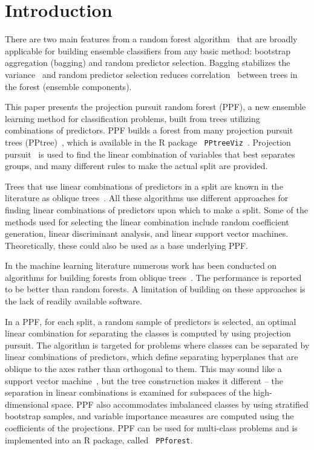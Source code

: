 \documentclass[12pt]{article}\usepackage[]{graphicx}\usepackage[]{color}
\begin{document}
\section{Introduction}
\label{sec:intro}

There are two main features from a random forest algorithm~\citep{breiman2001random} that are broadly applicable for building ensemble classifiers from any basic method: bootstrap aggregation (bagging) and random predictor selection. Bagging stabilizes the variance~\citep{breiman1996bagging, breiman1996heuristics} and random predictor selection reduces correlation~ \citep{amit1997shape, ho1998random} between trees in the forest (ensemble components).

This paper presents the projection pursuit random forest (PPF), a new ensemble learning method for classification problems, built from trees utilizing combinations of predictors. PPF builds a forest from many projection pursuit trees (PPtree)~\citep{lee2013pptree}, which is available in the R package \verb# PPtreeViz#~\citep{PPtreeViz}. Projection pursuit~\citep{friedman1973projection} is used to find the linear combination of variables that best separates groups, and many different rules to make the actual split are provided.

Trees that use linear combinations of predictors in a split are known in the literature as oblique trees~\citep{kim2001,brodley,tan2005mml,truong2009fast,lee2013pptree}.
All these algorithms use different approaches for finding linear combinations of predictors upon which to make a split. Some of the methods used for selecting the linear combination include random coefficient generation, linear discriminant analysis, and linear support vector machines. Theoretically, these could also be used as a base underlying PPF.

In the machine learning literature numerous work has been conducted on algorithms for building forests from oblique trees~\citep{tan2006decision, menze2011oblique, do2010classifying}. The performance is reported to be better than random forests. A limitation of building on these approaches is the lack of readily available software.

In a PPF, for each split, a random sample of predictors is selected, an optimal linear combination for separating the classes is computed by using projection pursuit. The algorithm is targeted for problems where classes can be separated by linear combinations of predictors, which define separating hyperplanes that are oblique to the axes rather than orthogonal to them. This may sound like a support vector machine~\citep{Cortes1995}, but the tree construction makes it different -- the separation in linear combinations is examined for subspaces of the high-dimensional space.  PPF also accommodates imbalanced classes by using stratified bootstrap samples, and variable importance measures are computed using the coefficients of the projections. PPF can be used for multi-class problems and is implemented into an R package, called \verb# PPforest#.
\end{document}
